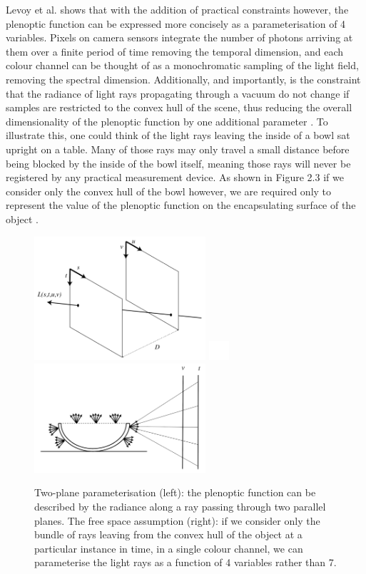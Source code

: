 Levoy et al. \cite{levoy1996lfrendering} shows that with the addition of practical constraints however, the plenoptic function can be expressed more concisely as a parameterisation of 4 variables. Pixels on camera sensors integrate the number of photons arriving at them over a finite period of time removing the temporal dimension, and each colour channel can be thought of as a monochromatic sampling of the light field, removing the spectral dimension. Additionally, and importantly, is the constraint that the radiance of light rays propagating through a vacuum do not change if samples are restricted to the convex hull of the scene, thus reducing the overall dimensionality of the plenoptic function by one additional parameter \cite{levoy1996lfrendering}. To illustrate this, one could think of the light rays leaving the inside of a bowl sat upright on a table. Many of those rays may only travel a small distance before being blocked by the inside of the bowl itself, meaning those rays will never be registered by any practical measurement device. As shown in Figure 2.3 if we consider only the convex hull of the bowl however, we are required only to represent the value of the plenoptic function on the encapsulating surface of the object \cite{gortler1996lumigraph}.

\begin{figure}[htbp]
    \centering
    \includegraphics[width=2.5in]{images/2pp.png}
    \label{convexhull}
    \includegraphics[width=0.3in]{images/blank.png}
    \includegraphics[width=2.5in]{images/convexhull.png}
    
    \caption[The two-plane parameterisation and the free-space assumption]{Two-plane parameterisation (left): the plenoptic function can be described by the radiance along a ray passing through two parallel planes. The free space assumption (right): if we consider only the bundle of rays leaving from the convex hull of the object at a particular instance in time, in a single colour channel, we can parameterise the light rays as a function of 4 variables rather than 7.}
    
    
\end{figure}

